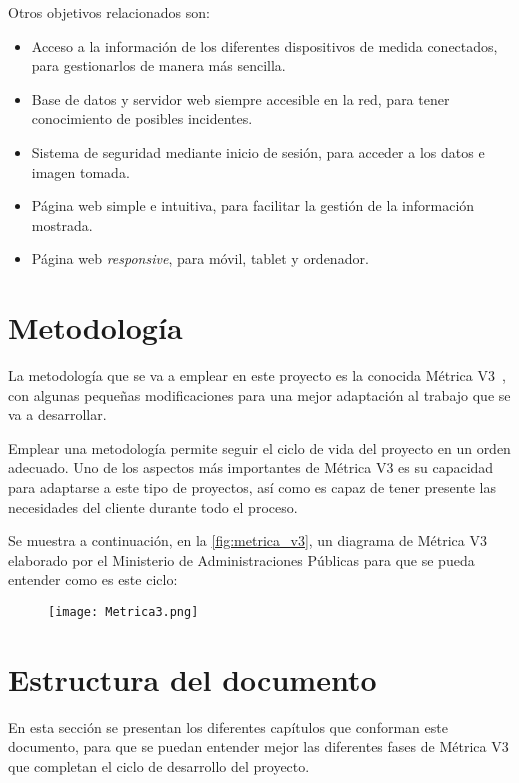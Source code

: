 Otros objetivos relacionados son:
\begin{itemize}
	\item Acceso a la información de los diferentes dispositivos de medida conectados, para gestionarlos de manera más sencilla.
	      \pagebreak
	      
	\item Base de datos y servidor web siempre accesible en la red, para tener conocimiento de posibles incidentes.
	\item Sistema de seguridad mediante inicio de sesión, para acceder a los datos e imagen tomada.
	\item Página web simple e intuitiva, para facilitar la gestión de la información mostrada.
	\item Página web \textit{responsive}, para móvil, tablet y ordenador.
\end{itemize}

\section{Metodología}\label{sec:metodologia}
La metodología que se va a emplear en este proyecto es la conocida Métrica V3~\cite{secretaria_general_de_administracion_digital_metrica_nodate}, con algunas pequeñas modificaciones para una mejor adaptación al trabajo que se va a desarrollar.

Emplear una metodología permite seguir el ciclo de vida del proyecto en un orden adecuado. Uno de los aspectos más importantes de Métrica V3 es su capacidad para adaptarse a este tipo de proyectos, así como es capaz de tener presente las necesidades del cliente durante todo el proceso.

Se muestra a continuación, en la \autoref{fig:metrica_v3}, un diagrama de Métrica V3 elaborado por el Ministerio de Administraciones Públicas para que se pueda entender como es este ciclo:

\begin{figure}[H]
	{\texttt{[image: Metrica3.png]}}
\end{figure}

\section{Estructura del documento}\label{sec:estructura-del-documento}
En esta sección se presentan los diferentes capítulos que conforman este documento, para que se puedan entender mejor las diferentes fases de Métrica V3 que completan el ciclo de desarrollo del proyecto. 

